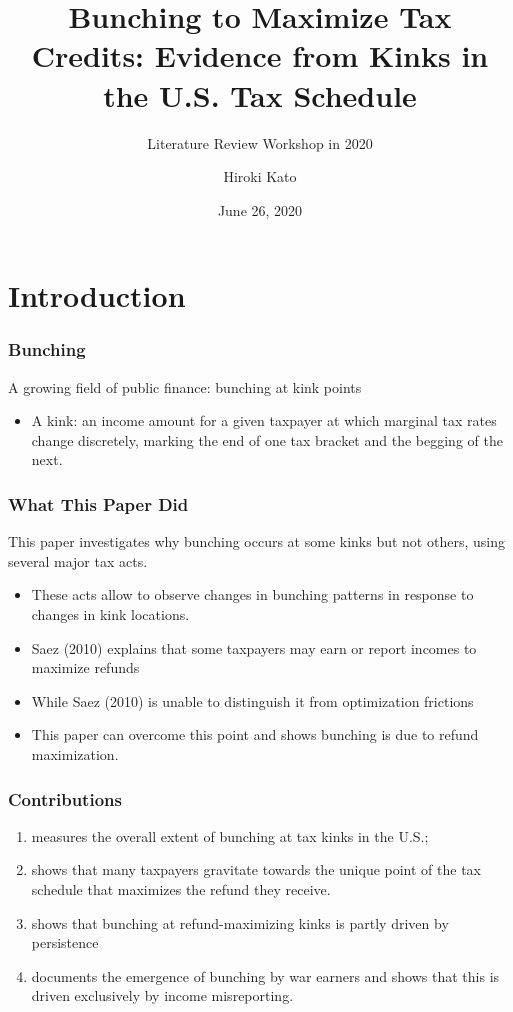 \documentclass[unicode,12pt]{beamer}
\title{Bunching to Maximize Tax Credits: Evidence from Kinks in the U.S. Tax Schedule}
\subtitle{Literature Review Workshop in 2020}
\author{Hiroki Kato}
\date{June 26, 2020}
\begin{document}
    \maketitle

    \section{Introduction}

    \begin{frame}
        \frametitle{Bunching}
    
        A growing field of public finance: bunching at kink points
        \begin{itemize}
            \item A kink: an income amount for a given taxpayer at which marginal tax rates change discretely, marking the end of one tax bracket and the begging of the next.
        \end{itemize}
    
    \end{frame}

    \begin{frame}
        \frametitle{What This Paper Did}
    
        This paper investigates why bunching occurs at some kinks but not others,
        using several major tax acts.
        \begin{itemize}
            \item These acts allow to observe changes in bunching patterns in response to changes in kink locations.
            \item Saez (2010) explains that some taxpayers may earn or report incomes to maximize refunds
            \item While Saez (2010) is unable to distinguish it from optimization frictions
            \item This paper can overcome this point and shows bunching is due to refund maximization.
        \end{itemize}
    
    \end{frame}

    \begin{frame}
        \frametitle{Contributions}
    
        \begin{enumerate}
            \item measures the overall extent of bunching at tax kinks in the U.S.;
            \item shows that many taxpayers gravitate towards the unique point of the tax schedule that maximizes the refund they receive.
            \item shows that bunching at refund-maximizing kinks is partly driven by persistence
            \item documents the emergence of bunching by war earners and shows that this is driven exclusively by income misreporting. 
        \end{enumerate}
    
    \end{frame}
\end{document}
